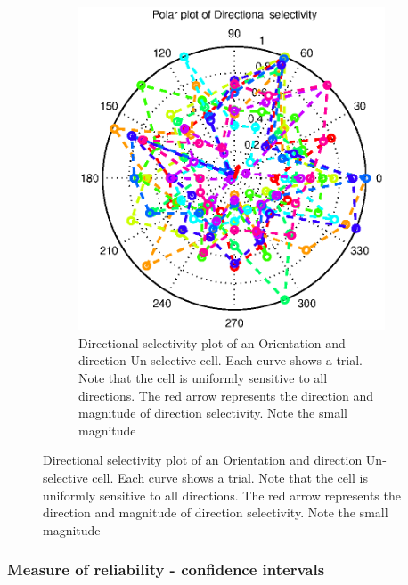 \documentclass[11pt]{article}
\begin{document}
\begin{enumerate}
\begin{figure}
\begin{subfigure}{.48\textwidth}
            \centering
            \includegraphics[width=\linewidth]{plots/min_cirvar_dir}
            \caption{Directional selectivity plot of an Orientation and direction Un-selective cell. Each curve shows a trial. Note that the cell is uniformly sensitive to all directions. The red arrow represents the direction and magnitude of direction selectivity. Note the small magnitude}
        \end{subfigure}
    \end{figure}
\end{enumerate}

\subsubsection{Measure of reliability - confidence intervals} %
\label{ssub:measure_of_reliability_confidence_intervals}

\end{document}
